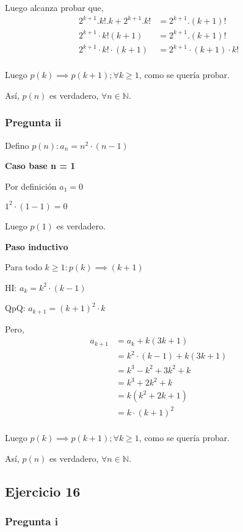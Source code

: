 Luego alcanza probar que,
\begin{align*}
    2^{k+1}.k!.k + 2^{k+1}.k! &= 2^{k+1}.(k+1)! \\
    2^{k+1}\cdot k!(k+1) &= 2^{k+1}.(k+1)! \\
    2^{k+1}\cdot k!\cdot (k+1) &= 2^{k+1}\cdot (k+1)\cdot k! \\
\end{align*}

Luego $p(k) \implies p(k+1); \forall k \geq 1$, como se quería probar.

Así, $p(n)$ es verdadero, $\forall n \in \mathbb{N}$.

\subsubsection{Pregunta ii}

Defino $ p(n): a_n = n^2\cdot (n-1) $

\textbf{Caso base n = 1}

Por definición $a_1 = 0$

$ 1^2\cdot (1-1) = 0 $

Luego $ p(1) $ es verdadero.

\textbf{Paso inductivo}

Para todo $k \geq 1: p(k) \implies (k+1)$

HI: $ a_k = k^2\cdot (k-1)$

QpQ: $ a_{k+1} = (k+1)^2\cdot k$

Pero,
\begin{align*}
    a_{k+1} &= a_k + k(3k+1) \\
    &= k^2\cdot (k-1) + k(3k+1) \\
    &= k^3 - k^2 + 3k^2+k \\
    &= k^3 +2k^2+k \\
    &= k(k^2 + 2k + 1)\\
    &= k\cdot (k+1)^2\\
\end{align*}

Luego $p(k) \implies p(k+1); \forall k \geq 1$, como se quería probar.

Así, $p(n)$ es verdadero, $\forall n \in \mathbb{N}$.

\subsection{Ejercicio 16}

\subsubsection{Pregunta i}

